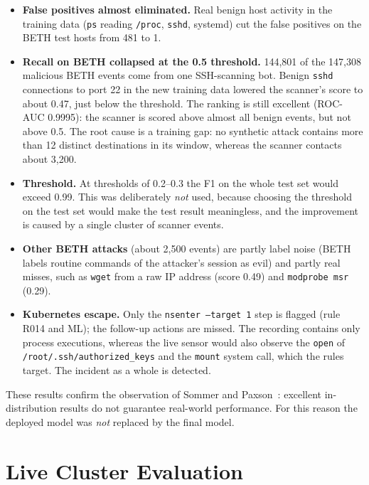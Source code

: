 \begin{itemize}
    \item \textbf{False positives almost eliminated.} Real benign host activity in the
          training data (\texttt{ps} reading \texttt{/proc}, \texttt{sshd}, systemd) cut
          the false positives on the BETH test hosts from 481 to 1.
    \item \textbf{Recall on BETH collapsed at the 0.5 threshold.} 144,801 of the 147,308
          malicious BETH events come from one SSH-scanning bot. Benign \texttt{sshd}
          connections to port 22 in the new training data lowered the scanner's score to
          about 0.47, just below the threshold. The ranking is still excellent (ROC-AUC
          0.9995): the scanner is scored above almost all benign events, but not above
          0.5. The root cause is a training gap: no synthetic attack contains more than 12
          distinct destinations in its window, whereas the scanner contacts about 3,200.
    \item \textbf{Threshold.} At thresholds of 0.2--0.3 the F1 on the whole test set would
          exceed 0.99. This was deliberately \emph{not} used, because choosing the
          threshold on the test set would make the test result meaningless, and the
          improvement is caused by a single cluster of scanner events.
    \item \textbf{Other BETH attacks} (about 2,500 events) are partly label noise (BETH
          labels routine commands of the attacker's session as evil) and partly real
          misses, such as \texttt{wget} from a raw IP address (score 0.49) and
          \texttt{modprobe msr} (0.29).
    \item \textbf{Kubernetes escape.} Only the \texttt{nsenter --target 1} step is flagged
          (rule R014 and ML); the follow-up actions are missed. The recording contains only
          process executions, whereas the live sensor would also observe the
          \texttt{open} of \texttt{/root/.ssh/authorized\_keys} and the \texttt{mount}
          system call, which the rules target. The incident as a whole is detected.
\end{itemize}
These results confirm the observation of Sommer and Paxson~\cite{sommer2010}: excellent
in-distribution results do not guarantee real-world performance. For this reason the
deployed model was \emph{not} replaced by the final model.

\section{Live Cluster Evaluation}

